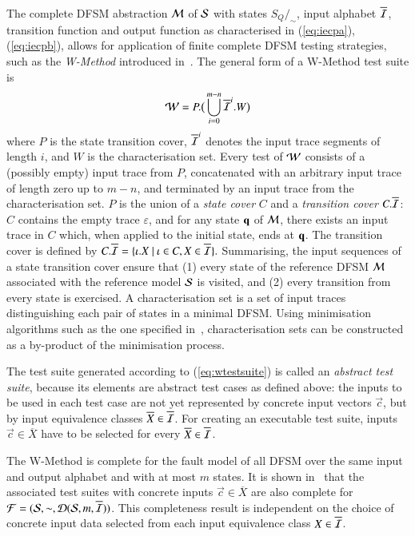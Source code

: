 The complete DFSM abstraction ${\cal M}$
 of ${\cal S}$ with states $S_Q/_\sim$, input alphabet
 $\overline{{\cal I}}$, transition function and output function
  as characterised in (\ref{eq:iecpa}), (\ref{eq:iecpb}), allows for application of 
finite complete DFSM testing strategies, such as the \emph{W-Method} introduced 
in~\cite{chow:wmethod,vasilevskii1973}. 
The general form of a W-Method test suite is 
\begin{equation}\label{eq:wtestsuite}
{\cal W} = P.\big(\bigcup_{i=0}^{m-n}\overline{\cal I}^i.W\big)
\end{equation}
where $P$ is the state transition cover, $\overline{\cal I}^i$ denotes the input trace segments of length $i$, and $W$ is the characterisation set.  Every test of  ${\cal W}$ consists of a (possibly empty) input trace from $P$, concatenated with an arbitrary input trace of length zero up to $m-n$, and  terminated by an input trace from the characterisation set. 
$P$  is the union of a {\it state cover} $C$ and  a
{\it transition cover} 
$C.\overline{\cal I}$: $C$ contains   the empty trace $\varepsilon$,
 and for any state $\textbf{q}$ of ${\cal M}$, there exists an input trace in $C$ which, 
 when applied to the initial state, ends at $\textbf{q}$. The transition cover  
 is defined by 
 $C.\overline{\cal I}=\{\iota.X~|~\iota \in C, X\in \overline{\cal I}\}.$ Summarising, the input sequences of a state transition cover ensure that (1) every state of the reference 
DFSM ${\cal M}$ associated with the reference model ${\cal S}$ is visited, and (2) every transition from every state is exercised.    A characterisation set is a set of input traces distinguishing each pair of states in a minimal DFSM. Using minimisation algorithms such as the one specified in~\cite{gill62}, characterisation sets can be constructed as a by-product of the minimisation process.

The test suite generated according to (\ref{eq:wtestsuite}) is called an 
\emph{abstract test suite}, because its elements are abstract test cases as defined above:
the inputs to be used in each test case are not yet
represented by concrete input vectors $\vec c$, but by input equivalence classes 
$\overline{X}\in \overline{{\cal I}}$. For creating an executable test suite,  inputs
$\vec c\in \overline{X}$ have to be selected for every   
$\overline{X}\in\overline{{\cal I}}$. 

The W-Method is complete for the fault model of all DFSM over the
same input and output alphabet and with at most $m$ states. It is shown in~\cite{peleska_sttt_2014}
that the associated   test suites with concrete inputs $\vec c\in \overline{X}$ are also complete for 
${\cal F} = ({\cal S},\sim,{\cal D}({\cal S},m,\overline{{\cal I}}))$. This completeness 
result is independent on the choice of concrete input data selected from each input 
equivalence class $X\in\overline{\cal I}$.

